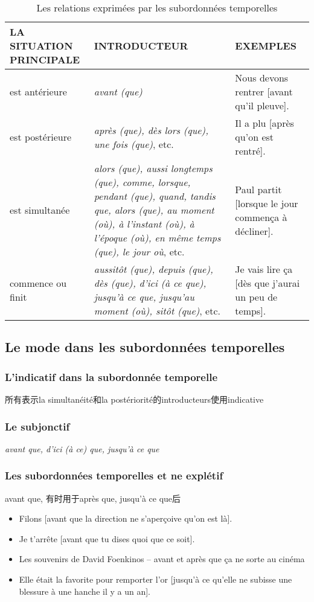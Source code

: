 \documentclass[UTF8]{report}
\begin{document}
\begin{table}[H]
    \centering
    \small
    \begin{tabular}{|p{3.5cm}|>{\RaggedRight}p{6cm}|p{6.5cm}|}
    \hline
    \rowcolor{cyan!20}
    \textbf{LA SITUATION PRINCIPALE} & \textbf{INTRODUCTEUR} & \textbf{EXEMPLES} \\
    \hline
    est antérieure & \textit{avant (que)} & Nous devons rentrer [avant qu'il pleuve]. \\
    \hline
    est postérieure & \textit{après (que), dès lors (que), une fois (que)}, etc. & Il a plu [après qu'on est rentré]. \\
    \hline
    est simultanée & \textit{alors (que), aussi longtemps (que), comme, lorsque, pendant (que), quand, tandis que, alors (que), au moment (où), à l'instant (où), à l'époque (où), en même temps (que), le jour où}, etc. & Paul partit [lorsque le jour commença à décliner]. \\
    \hline
    commence ou finit & \textit{aussitôt (que), depuis (que), dès (que), d'ici (à ce que), jusqu'à ce que, jusqu'au moment (où), sitôt (que)}, etc. & Je vais lire ça [dès que j'aurai un peu de temps]. \\
    \hline
    \end{tabular}
    \caption{Les relations exprimées par les subordonnées temporelles}
\end{table}


\subsection{Le mode dans les subordonnées temporelles}

\subsubsection{L’indicatif dans la subordonnée temporelle}
所有表示la simultanéité和la postériorité的introducteurs使用indicative

\subsubsection{Le subjonctif}
\textit{avant que, d’ici (à ce) que, jusqu’à ce que}

\subsubsection{Les subordonnées temporelles et ne explétif}
avant que, 有时用于après que, jusqu’à ce que后
\begin{itemize}
    \item Filons [avant que la direction ne s’aperçoive qu’on est là].
    \item Je t’arrête [avant que tu dises quoi que ce soit].
    \item Les souvenirs de David Foenkinos – avant et après que ça ne sorte au cinéma
    \item Elle était la favorite pour remporter l’or [jusqu’à ce qu’elle ne subisse une blessure à une hanche il y a un an].
\end{itemize}
\end{document}
